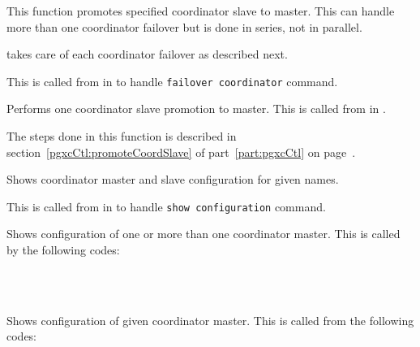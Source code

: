       This function promotes specified coordinator slave to master.
      This can handle more than one coordinator failover but is done in series, not in parallel.
      
       takes care of each coordinator failover as described next.
      
      This is called from  in  to handle
	  \texttt{failover coordinator} command.
  
  
      Performs one coordinator slave promotion to master.
      This is called from  in .
      
      The steps done in this function is described in section~\ref{pgxcCtl:promoteCoordSlave} of
	  part~\ref{part:pgxcCtl} on page~\pageref{pgxcCtl:promoteCoordSlave}.
  
  
      Shows coordinator master and slave configuration for given names.
      
      This is called from  in  to handle
      \texttt{show configuration} command.
  
  
      Shows configuration of one or more than one coordinator master.
      This is called by the following codes:
      
      \FuncRefHdr
		  \\ \vspace{3pt}
		  \\ \hline
      \FuncRefTrailor
  
  
      Shows configuration of given coordinator master.
      This is called from the following codes:
      
